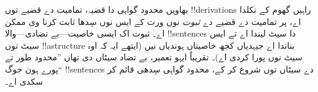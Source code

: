 \documentclass[../../../include/open-logic-section]{subfiles}
\begin{document}
بھاویں محدود گواہی دا قضیہ، تمامیت دے قضیے توں
!!{derivation}s راہیں گھوم کے نکلدا اے، پر تمامیت دے قضیے دے
\emph{ثبوت} نوں ورت کے ایس نوں سِدھا ثابت کرنا وی ممکن اے۔
ثبوت اک ایسی خاصیت---بے تضادی---والا !!{sentence}s دا سیٹ
لیندا اے تے ایس سیٹ توں !!a{structure} بناندا اے جیہدیاں
کجھ خاصیتاں ہوندیاں نیں (ایتھے ایہ کہ اوہ سیٹ نوں پورا کردی اے)۔
تقریباً ایہو تعمیر، بے تضاد سیٹاں دی تھاں ”محدود طور تے پورے
ہون جوگ“ !!{sentence}s دے سیٹاں توں شروع کر کے، محدود گواہی
سِدھی قائم کر سکدی اے۔
\end{document}
